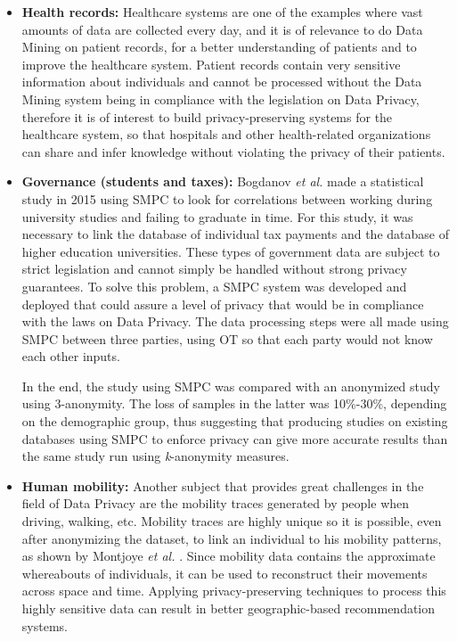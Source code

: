 \begin{itemize}
	\setlength\itemsep{1em}
	\item \textbf{Health records:} Healthcare systems are one of the examples where vast amounts of data are collected every day, and it is of relevance to do Data Mining on patient records, for a better understanding of patients and to improve the healthcare system. Patient records contain very sensitive information about individuals and cannot be processed without the Data Mining system being in compliance with the legislation on Data Privacy, therefore it is of interest to build privacy-preserving systems for the healthcare system, so that hospitals and other health-related organizations can share and infer knowledge without violating the privacy of their patients.

	\item \textbf{Governance (students and taxes):} Bogdanov \textit{et al.} \cite{Bogdanov2015} made a statistical study in 2015 using \ac{SMPC} to look for correlations between working during university studies and failing to graduate in time. For this study, it was necessary to link the database of individual tax payments and the database of higher education universities. These types of government data are subject to strict legislation and cannot simply be handled without strong privacy guarantees.
    To solve this problem, a \ac{SMPC} system was developed and deployed that could assure a level of privacy that would be in compliance with the laws on Data Privacy. The data processing steps were all made using \ac{SMPC} between three parties, using \ac{OT} so that each party would not know each other inputs.
    
    In the end, the study using \ac{SMPC} was compared with an anonymized study using 3-anonymity. The loss of samples in the latter was 10\%-30\%, depending on the demographic group, thus suggesting that producing studies on existing databases using \ac{SMPC} to enforce privacy can give more accurate results than the same study run using \textit{k}-anonymity measures.

	\item \textbf{Human mobility:} Another subject that provides great challenges in the field of Data Privacy are the mobility traces generated by people when driving, walking, etc. Mobility traces are highly unique so it is possible, even after anonymizing the dataset, to link an individual to his mobility patterns, as shown by Montjoye \textit{et al.} \cite{de2013unique}. Since mobility data contains the approximate whereabouts of individuals, it can be used to reconstruct their movements across space and time. Applying privacy-preserving techniques to process this highly sensitive data can result in better geographic-based recommendation systems.
\end{itemize}



